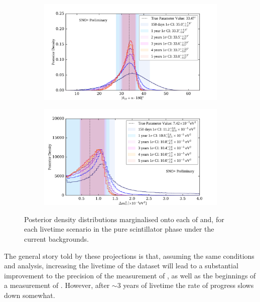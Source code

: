 \begin{figure}
    \centering
    \begin{subfigure}{0.98\textwidth}
        \centering
        \includegraphics[width=\textwidth]{6_SolarAnalysis/images/theta_12_comparison_projections.pdf}
        \caption{}
        \label{fig:1d_posteriors_projections_theta}
    \end{subfigure}
    \begin{subfigure}{0.98\textwidth}
        \centering
        \includegraphics[width=\textwidth]{6_SolarAnalysis/images/dmsq_21_comparison_projections.pdf}
        \caption{}
        \label{fig:1d_posteriors_projections_dmsq}
    \end{subfigure}
    \caption[Posterior density posterior distributions marginalised onto each of \tonetwo{} and \dmsq{}, for each livetime scenario]
        {Posterior density distributions marginalised onto each of \tonetwo{} and\dmsq{}, for each livetime scenario in the pure scintillator phase under the current backgrounds.}
    \label{fig:1d_posteriors_projections}
\end{figure}

The general story told by these projections is that, assuming the same conditions and analysis, increasing the livetime of the dataset will lead to a substantial improvement to the precision of the measurement of \tonetwo{}, as well as the beginnings of a measurement of \dmsq{}. However, after $\sim$3 years of livetime the rate of progress slows down somewhat.

